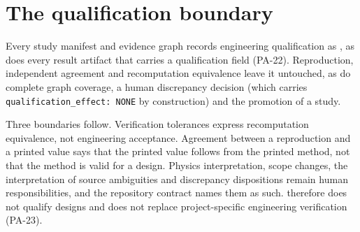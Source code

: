 \section{The qualification boundary}
\label{sec:qualification}

Every study manifest and evidence graph records engineering qualification as , as does every result artifact that carries a qualification field (PA-22). Reproduction, independent agreement and recomputation equivalence leave it untouched, as do complete graph coverage, a human discrepancy decision (which carries \texttt{qualification\_effect: NONE} by construction) and the promotion of a study.

Three boundaries follow. Verification tolerances express recomputation equivalence, not engineering acceptance. Agreement between a reproduction and a printed value says that the printed value follows from the printed method, not that the method is valid for a design. Physics interpretation, scope changes, the interpretation of source ambiguities and discrepancy dispositions remain human responsibilities, and the repository contract names them as such. \engiproof{} therefore does not qualify designs and does not replace project-specific engineering verification (PA-23).
